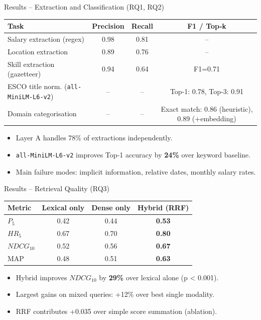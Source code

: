 \documentclass[aspectratio=169, 10pt]{beamer}
\begin{document}
\begin{frame}{Results – Extraction and Classification (RQ1, RQ2)}
\begin{table}
\centering
\begin{tabular}{lccc}
\toprule
Task & Precision & Recall & F1 / Top‑k \\
\midrule
Salary extraction (regex) & 0.98 & 0.81 & – \\
Location extraction & 0.89 & 0.76 & – \\
Skill extraction (gazetteer) & 0.94 & 0.64 & F1=0.71 \\
ESCO title norm. (\texttt{all-MiniLM-L6-v2}) & – & – & Top‑1: 0.78, Top‑3: 0.91 \\
Domain categorisation & – & – & Exact match: 0.86 (heuristic), 0.89 (+embedding) \\
\bottomrule
\end{tabular}
\end{table}
\begin{itemize}
\item Layer A handles 78\% of extractions independently.
\item \texttt{all-MiniLM-L6-v2} improves Top‑1 accuracy by \textbf{24\%} over keyword baseline.
\item Main failure modes: implicit information, relative dates, monthly salary rates.
\end{itemize}
\end{frame}

\begin{frame}{Results – Retrieval Quality (RQ3)}
\begin{table}
\centering
\begin{tabular}{lccc}
\toprule
Metric & Lexical only & Dense only & \textbf{Hybrid (RRF)} \\
\midrule
$P_5$ & 0.42 & 0.44 & \textbf{0.53} \\
$HR_5$ & 0.67 & 0.70 & \textbf{0.80} \\
$NDCG_{10}$ & 0.52 & 0.56 & \textbf{0.67} \\
MAP & 0.48 & 0.51 & \textbf{0.63} \\
\bottomrule
\end{tabular}
\end{table}
\begin{itemize}
\item Hybrid improves $NDCG_{10}$ by \textbf{29\%} over lexical alone (p < 0.001).
\item Largest gains on mixed queries: +12\% over best single modality.
\item RRF contributes +0.035 over simple score summation (ablation).
\end{itemize}
\end{frame}
\end{document}
